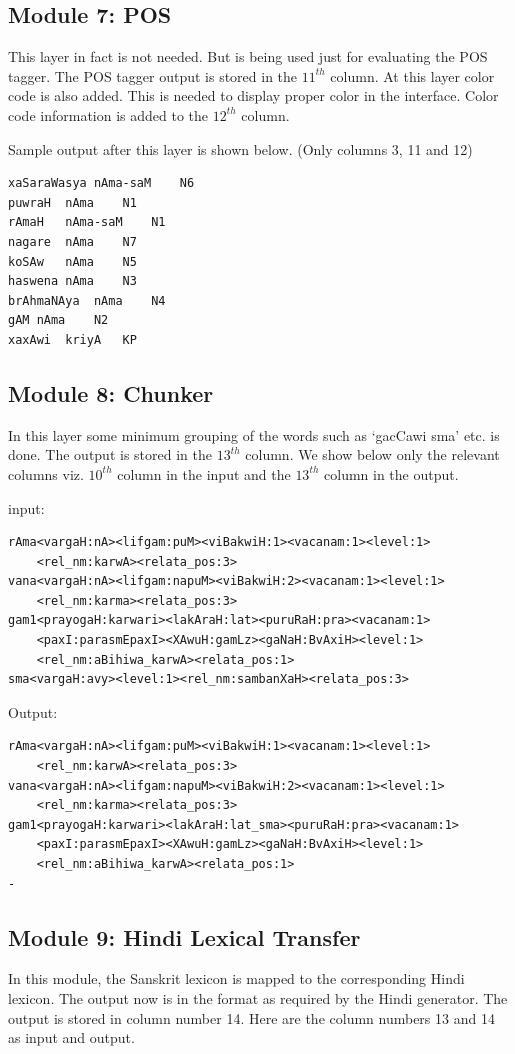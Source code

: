 \documentclass{llncs}
\begin{document}
\subsection{Module 7: POS}
This layer in fact is not needed. But is being used just for evaluating the POS tagger. The POS tagger output is stored in the $11^{th}$ column.
At this layer color code is also added. This is needed to display proper color in the interface. Color code information is added to the $12^{th}$ column.

\noindent 
Sample output after this layer is shown below. (Only columns 3, 11 and 12)
\begin{verbatim}
xaSaraWasya	nAma-saM	N6
puwraH	nAma	N1
rAmaH	nAma-saM	N1
nagare	nAma	N7
koSAw	nAma	N5
haswena	nAma	N3
brAhmaNAya	nAma	N4
gAM	nAma	N2
xaxAwi	kriyA	KP
\end{verbatim}

\subsection{Module 8: Chunker}
In this layer some minimum grouping of the words such as `gacCawi sma' etc. is done. The output is stored in the $13^{th}$ column. We show below only the relevant columns viz. $10^{th}$ column in the input and the $13^{th}$ column in the output.

\noindent 
input:
\begin{verbatim}
rAma<vargaH:nA><lifgam:puM><viBakwiH:1><vacanam:1><level:1>
    <rel_nm:karwA><relata_pos:3>
vana<vargaH:nA><lifgam:napuM><viBakwiH:2><vacanam:1><level:1>
    <rel_nm:karma><relata_pos:3>
gam1<prayogaH:karwari><lakAraH:lat><puruRaH:pra><vacanam:1>
    <paxI:parasmEpaxI><XAwuH:gamLz><gaNaH:BvAxiH><level:1>
    <rel_nm:aBihiwa_karwA><relata_pos:1>
sma<vargaH:avy><level:1><rel_nm:sambanXaH><relata_pos:3>
\end{verbatim}

\noindent 
Output:
\begin{verbatim}
rAma<vargaH:nA><lifgam:puM><viBakwiH:1><vacanam:1><level:1>
    <rel_nm:karwA><relata_pos:3>
vana<vargaH:nA><lifgam:napuM><viBakwiH:2><vacanam:1><level:1>
    <rel_nm:karma><relata_pos:3>
gam1<prayogaH:karwari><lakAraH:lat_sma><puruRaH:pra><vacanam:1>
    <paxI:parasmEpaxI><XAwuH:gamLz><gaNaH:BvAxiH><level:1>
    <rel_nm:aBihiwa_karwA><relata_pos:1>
-
\end{verbatim}

\subsection{Module 9: Hindi Lexical Transfer}
In this module, the Sanskrit lexicon is mapped to the corresponding Hindi lexicon. The output now is in the format as required by the Hindi generator. The output is stored in column number 14.
Here are the column numbers 13 and 14 as input and output.
\end{document}
